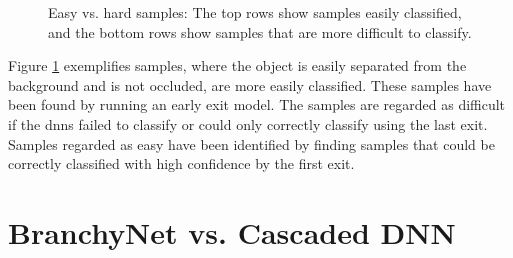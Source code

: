 \begin{figure}
	\captionsetup[subfigure]{justification=centering}
	\centering
	\hfill
	\caption[Easy vs. hard samples]{Easy vs. hard samples: The top rows show samples easily classified, and the bottom rows show samples that are more difficult to classify. }
	\label{fig:hardvseasy}
\end{figure}

Figure \ref{fig:hardvseasy} exemplifies samples, where the object is easily separated from the background and is not occluded, are more easily classified. These samples have been found by running an early exit model. The samples are regarded as difficult if the \gls{dnn}s failed to classify or could only correctly classify using the last exit. Samples regarded as easy have been identified by finding samples that could be correctly classified with high confidence by the first exit.

\section{BranchyNet vs. Cascaded DNN} \label{sec:ee-branchy-vs-cascaded}

